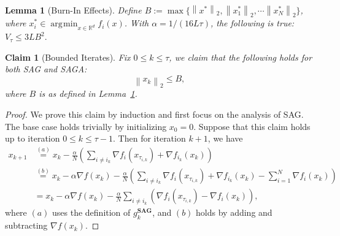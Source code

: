 \documentclass[10pt,a4paper]{amsart}
\newtheorem{lemma}{Lemma}
\newtheorem{claim}{Claim}
\DeclareMathOperator*{\argmin}{\arg\!\min}
\newcommand{\norm}[1]{\left\| #1\right\|_{2}}
\newcommand{\paren}[1]{\left( #1\right)}
\begin{document}
\begin{lemma}[Burn-In Effects]\label{lem:burnin}
Define $B:=\max\{\norm{x^*}, \norm{x_1^*},\cdots\norm{x_N^*}\}$, where $x_i^* \in \argmin_{x \in \mathbb{R}^d} f_i(x)$. With $\alpha = 1/(16 L \tau)$, the following is true: 
    $V_\tau\leq 3LB^2.$
\end{lemma}

\begin{claim}[Bounded Iterates]\label{claim1}
Fix $0\leq k\leq \tau$, we claim that the following holds for both SAG and SAGA:
\begin{equation}
    \norm{x_k}\leq B,
\end{equation}
where $B$ is as defined in Lemma~\ref{lem:burnin}. 
\end{claim}

\begin{proof}
We prove this claim by induction and first focus on the analysis of SAG. The base case holds trivially by initializing $x_0=0$. Suppose that this claim holds up to iteration $0\leq k\leq \tau-1$. Then for iteration $k+1$, we have
\begin{equation}
\begin{aligned}
        x_{k+1}&\overset{(a)}{=}x_k-\frac{\alpha}{N}\paren{\sum_{i\neq i_k}\nabla f_i(x_{\tau_{i,k}})+\nabla f_{i_k}(x_k)}\\
        &\overset{(b)}{=}x_k-\alpha\nabla f(x_k) -\frac{\alpha}{N}\paren{\sum_{i\neq i_k}\nabla f_i(x_{\tau_{i,k}})+\nabla f_{i_k}(x_k)-\sum_{i=1}^N\nabla f_i(x_k)}\\
        &=x_k-\alpha\nabla f(x_k)-\frac{\alpha}{N}\sum_{i\neq i_k}\paren{\nabla f_i(x_{\tau_{i,k}}) - \nabla f_i(x_k)},
\end{aligned}
\end{equation}
where $(a)$ uses the definition of $g_k^\textbf{SAG}$, and $(b)$ holds by adding and subtracting $\nabla f(x_k)$.


\end{proof}
\end{document}
